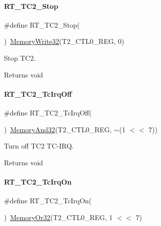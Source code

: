 \paragraph{\texorpdfstring{R\+T\+\_\+\+T\+C2\+\_\+\+Stop}{RT\_TC2\_Stop}}
{\footnotesize\ttfamily \#define R\+T\+\_\+\+T\+C2\+\_\+\+Stop(\begin{DoxyParamCaption}{ }\end{DoxyParamCaption})~\mbox{\hyperlink{a00020_ad9953f631a539cfaa35baf94f878b3ec}{Memory\+Write32}}(T2\+\_\+\+C\+T\+L0\+\_\+\+R\+EG, 0)}



Stop T\+C2. 

\begin{DoxyReturn}{Returns}
void 
\end{DoxyReturn}
\mbox{\label{a00047_a12e287a7ca5033554b5dc4693a231319}} 
\paragraph{\texorpdfstring{R\+T\+\_\+\+T\+C2\+\_\+\+Tc\+Irq\+Off}{RT\_TC2\_TcIrqOff}}
{\footnotesize\ttfamily \#define R\+T\+\_\+\+T\+C2\+\_\+\+Tc\+Irq\+Off(\begin{DoxyParamCaption}{ }\end{DoxyParamCaption})~\mbox{\hyperlink{a00020_a5c1a2bd4c1bd4c2f429d8042a45327ff}{Memory\+And32}}(T2\+\_\+\+C\+T\+L0\+\_\+\+R\+EG, $\sim$(1 $<$$<$ 7))}



Turn off T\+C2 T\+C-\/\+I\+RQ. 

\begin{DoxyReturn}{Returns}
void 
\end{DoxyReturn}
\mbox{\label{a00047_a0d385385ff809f653b9e7a6d6a111838}} 
\paragraph{\texorpdfstring{R\+T\+\_\+\+T\+C2\+\_\+\+Tc\+Irq\+On}{RT\_TC2\_TcIrqOn}}
{\footnotesize\ttfamily \#define R\+T\+\_\+\+T\+C2\+\_\+\+Tc\+Irq\+On(\begin{DoxyParamCaption}{ }\end{DoxyParamCaption})~\mbox{\hyperlink{a00020_a9ea92ebccdef6bdaca4d00210cc7266d}{Memory\+Or32}}(T2\+\_\+\+C\+T\+L0\+\_\+\+R\+EG, 1 $<$$<$ 7)}



